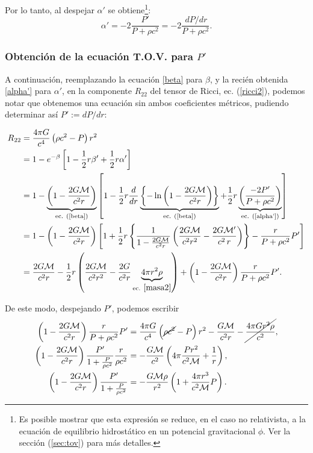 Por lo tanto, al despejar $\alpha'$ se obtiene\footnote{Es posible mostrar que esta expresión se reduce, en el caso no relativista, a la ecuación de equilibrio hidrostático en un potencial gravitacional $\phi$. Ver la sección (\ref{sec:tov}) para más detalles.}:
\begin{equation}\label{alpha'}
 \alpha'=-2\frac{P'}{P+\rho c^2}=-2\frac{\,dP/dr}{P+\rho c^2}.
\end{equation}


\subsubsection{Obtención de la ecuación T.O.V. para \texorpdfstring{$P'$}{P}}
A continuación, reemplazando la ecuación \eqref{beta} para $\beta$, y la recién obtenida \eqref{alpha'} para $\alpha'$,  en la componente $R_{22}$ del tensor de Ricci, ec. (\ref{ricci2}), podemos notar que obtenemos una ecuación sin ambos coeficientes métricos, pudiendo determinar así $P':=dP/dr:$

\begin{align}
 R_{22}&=\frac{4\pi G}{c^{4}}\left( \rho  c^2-P\right)r^2\\
&=1-e^{-\beta}\left[1-\frac{1}{2}r\beta'+\frac{1}{2}r\alpha'\right]\\
&=1-\underbrace{\left(1-\frac{2G\mathcal{M}}{c^2r}\right)}_{\text{ec. (\ref{beta})}}\left[1-\frac{1}{2}r\frac{d}{dr}\underbrace{\left\{-\ln\left(1-\frac{2G\mathcal{M}}{c^2r}\right)\right\}}_{\text{ec. (\ref{beta})}}+\frac{1}{2}r\underbrace{\left(\frac{-2P'}{P+\rho c^2}\right)}_{\text{ec. (\ref{alpha'})}}\right]\\
&=1-\left(1-\frac{2G\mathcal{M}}{c^2r}\right)\left[1+\frac{1}{2}r\left\{\frac{1}{1-\frac{2G\mathcal{M}}{c^2r}}\left(\frac{2G\mathcal{M}}{c^2r^2}-\frac{2G\mathcal{M}'}{c^2\,r}\right)\right\}-\frac{r}{P+\rho c^2}P'\right]\\
&=\frac{2G\mathcal{M}}{c^2r}-\frac{1}{2}r\left(\frac{2G\mathcal{M}}{c^2r^2}-\frac{2G}{c^2r}\underbrace{4\pi r^2\rho}_{\text{ec. } \eqref{masa2}}\right)+\left(1-\frac{2G\mathcal{M}}{c^2r}\right)\frac{r}{P+\rho c^2}P'.
\end{align}

De este modo, despejando $P'$, podemos escribir
\begin{align}
 \left(1-\frac{2G\mathcal{M}}{c^2r}\right)\frac{r}{P+\rho c^2}P'&=\frac{4\pi G}{c^{4}}\left( \cancel{\rho c^2}-P\right)r^2-\frac{G\mathcal{M}}{c^2 r}-\cancel{\frac{4\pi Gr^2\rho}{c^2}},\\
\left(1-\frac{2G\mathcal{M}}{c^2r}\right)\frac{P'}{1+\frac{P}{\rho c^2}}\frac{r}{\rho c^2}&=-\frac{G\mathcal{M}}{c^2}\left(4\pi \frac{P r^2}{c^2\mathcal{M}}+\frac{1}{r}\right),\\
\left(1-\frac{2G\mathcal{M}}{c^2r}\right)\frac{P'}{1+\frac{P}{\rho c^2}}&=-\frac{G\mathcal{M}\rho}{r^2}\left(1+\frac{4\pi r^3}{c^2 \mathcal{M}}P\right).
\end{align}

